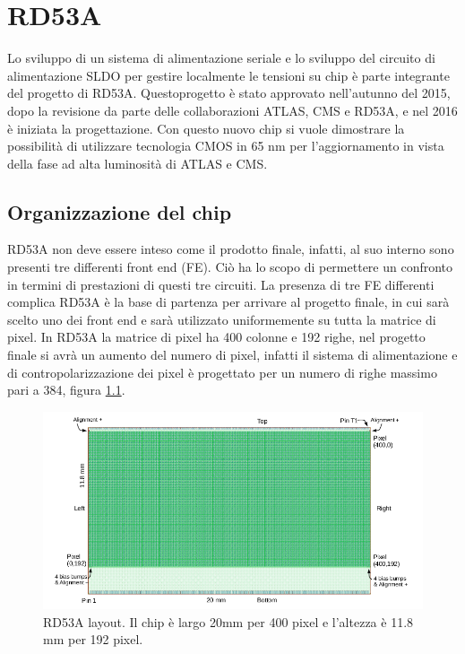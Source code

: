 \chapter{RD53A}

Lo sviluppo di un sistema di alimentazione seriale e lo sviluppo del circuito di alimentazione SLDO per gestire localmente le tensioni su chip è parte integrante del progetto di RD53A.
Questoprogetto è stato approvato nell'autunno del 2015, dopo la revisione da parte delle collaborazioni ATLAS, CMS e RD53A, e nel 2016 è iniziata la progettazione. 
Con questo nuovo chip si vuole dimostrare la possibilità di utilizzare tecnologia CMOS  in 65 nm per l'aggiornamento in vista della fase ad alta luminosità di ATLAS e CMS. 

\section{Organizzazione del chip} 
RD53A non deve essere inteso come il prodotto finale, infatti, al suo interno sono presenti tre differenti front end (FE). Ciò ha lo scopo di permettere un confronto in termini di prestazioni di questi tre circuiti. La presenza di tre FE differenti complica
RD53A è la base di partenza per arrivare al progetto finale, in cui sarà scelto uno dei front end e sarà utilizzato uniformemente su tutta la matrice di pixel. In RD53A la matrice di pixel ha 400 colonne e 192 righe, nel progetto finale si avrà un aumento del numero di pixel, infatti il sistema di alimentazione e di contropolarizzazione dei pixel è progettato per un numero di righe massimo pari a 384, figura \ref{RD53ALayout}.
\begin{figure}
\centering
\includegraphics[scale=.4]{Immagini/RD53ALayout}
\caption{RD53A layout. Il chip è largo 20mm per 400 pixel e l'altezza è 11.8 mm per 192 pixel.}
\label{RD53ALayout}
\end{figure}

